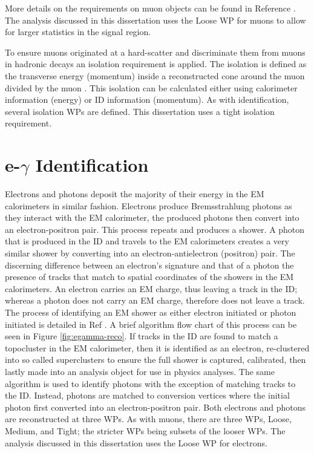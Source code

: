 		More details on the requirements on muon objects can be found in Reference \cite{ATLAS-muon}. The analysis discussed in this dissertation uses the Loose \gls{WP} for muons to allow for larger statistics in the signal region.

		To ensure muons originated at a hard-scatter and discriminate them from muons in hadronic decays an isolation requirement is applied. The isolation is defined as the transverse energy (momentum) inside a reconstructed cone around the muon divided by the muon \pt \cite{ATLAS-muon}. This isolation can be calculated either using calorimeter information (energy) or \gls{ID} information (momentum). As with identification, several isolation \glspl{WP} are defined. This dissertation uses a tight isolation requirement.


	\section{e-$\gamma$ Identification}\label{sec:reco-egamma}
		Electrons and photons deposit the majority of their energy in the \gls{EM} calorimeters in similar fashion. Electrons produce Bremsstrahlung photons as they interact with the \gls{EM} calorimeter, the produced photons then convert into an electron-positron pair. This process repeats and produces a shower. A photon that is produced in the \gls{ID} and travels to the \gls{EM} calorimeters creates a very similar shower by converting into an electron-antielectron (positron) pair. The discerning difference between an electron's signature and that of a photon the presence of tracks that match to spatial coordinates of the showers in the \gls{EM} calorimeters. An electron carries an \gls{EM} charge, thus leaving a track in the \gls{ID}; whereas a photon does not carry an \gls{EM} charge, therefore does not leave a track. The process of identifying an \gls{EM} shower as either electron initiated or photon initiated is detailed in Ref \cite{electron-perf}. A brief algorithm flow chart of this process can be seen in Figure \ref{fig:egamma-reco}. If tracks in the \gls{ID} are found to match a topocluster in the \gls{EM} calorimeter, then it is identified as an electron, re-clustered into so called superclusters to ensure the full shower is captured, calibrated, then lastly made into an analysis object for use in physics analyses. The same algorithm is used to identify photons with the exception of matching tracks to the \gls{ID}. Instead, photons are matched to conversion vertices where the initial photon first converted into an electron-positron pair. Both electrons and photons are reconstructed at three \glspl{WP}. As with muons, there are three WPs, Loose, Medium, and Tight; the stricter \glspl{WP} being subsets of the looser WPs. The analysis discussed in this dissertation uses the Loose \gls{WP} for electrons.

